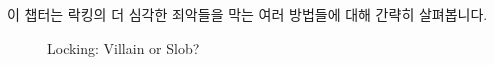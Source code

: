 이 챕터는 락킹의 더 심각한 죄악들을 막는 여러 방법들에 대해 간략히 살펴봅니다.

\begin{figure}[tb]
\begin{center}
\end{center}
\caption{Locking: Villain or Slob?}
\end{figure}

